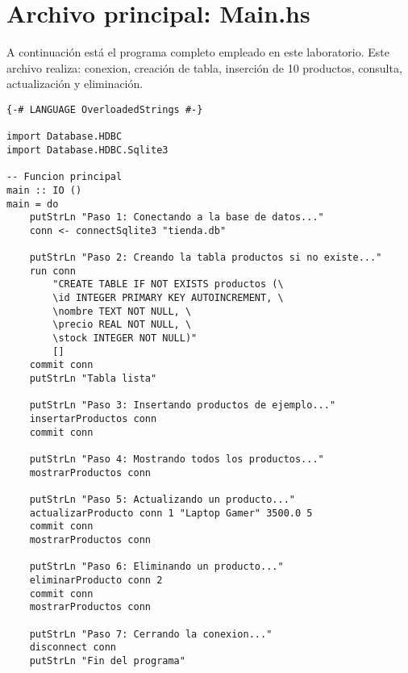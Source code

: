 \documentclass[12pt]{article}
\begin{document}
\section*{Archivo principal: Main.hs}
A continuaci\'on est\'a el programa completo empleado en este laboratorio. Este archivo realiza: conexion, creaci\'on de tabla, inserci\'on de 10 productos, consulta, actualizaci\'on y eliminaci\'on.

\begin{lstlisting}[style=haskell, caption=Main.hs (programa completo)]
{-# LANGUAGE OverloadedStrings #-}

import Database.HDBC
import Database.HDBC.Sqlite3

-- Funcion principal
main :: IO ()
main = do
    putStrLn "Paso 1: Conectando a la base de datos..."
    conn <- connectSqlite3 "tienda.db"

    putStrLn "Paso 2: Creando la tabla productos si no existe..."
    run conn
        "CREATE TABLE IF NOT EXISTS productos (\
        \id INTEGER PRIMARY KEY AUTOINCREMENT, \
        \nombre TEXT NOT NULL, \
        \precio REAL NOT NULL, \
        \stock INTEGER NOT NULL)"
        []
    commit conn
    putStrLn "Tabla lista"

    putStrLn "Paso 3: Insertando productos de ejemplo..."
    insertarProductos conn
    commit conn

    putStrLn "Paso 4: Mostrando todos los productos..."
    mostrarProductos conn

    putStrLn "Paso 5: Actualizando un producto..."
    actualizarProducto conn 1 "Laptop Gamer" 3500.0 5
    commit conn
    mostrarProductos conn

    putStrLn "Paso 6: Eliminando un producto..."
    eliminarProducto conn 2
    commit conn
    mostrarProductos conn

    putStrLn "Paso 7: Cerrando la conexion..."
    disconnect conn
    putStrLn "Fin del programa"
    


\end{lstlisting}
\end{document}
